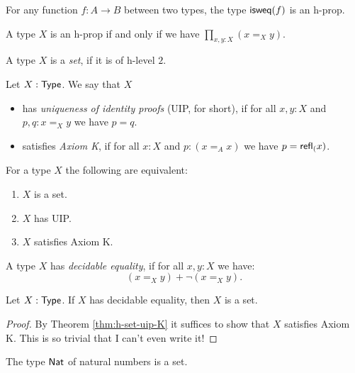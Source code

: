 \begin{cor}
 For any function $f \colon A \to B$ between two types, the type $\mathsf{isweq}(f)$ is an h-prop.
\end{cor}

\begin{thm}
 A type $X$ is an h-prop if and only if we have $\prod\limits_{x, y : X} (x =_X y)$.
\end{thm}

\begin{defn}
 A type $X$ is a {\em set}, if it is of h-level $2$.
\end{defn}

\begin{defn}
 Let $X : \mathsf{Type}$. We say that $X$
 \begin{itemize}
  \item has {\em uniqueness of identity proofs} (UIP, for short), if for all $x, y : X$ and $p, q : x =_X y$ we have $p = q$.
  \item satisfies {\em Axiom K}, if for all $x : X$ and $p : (x =_A x)$ we have $p = \mathsf{refl}_{(} x)$.
 \end{itemize}
\end{defn}

\begin{thm}\label{thm:h-set-uip-K}
 For a type $X$ the following are equivalent:
 \begin{enumerate}
  \item $X$ is a set.
  \item $X$ has UIP.
  \item $X$ satisfies Axiom K.
 \end{enumerate}
\end{thm}

\begin{defn}
 A type $X$ has {\em decidable equality}, if for all $x, y : X$ we have:
 \[(x =_X y) + \neg (x =_X y).\]
\end{defn}

\begin{thm}
 Let $X : \mathsf{Type}$. If $X$ has decidable equality, then $X$ is a set.
\end{thm}

\begin{proof}
 By Theorem \ref{thm:h-set-uip-K} it suffices to show that $X$ satisfies Axiom K. This is so trivial that I can't even write it!
\end{proof}

\begin{thm}\label{prop:nat-is-set}
 The type $\mathsf{Nat}$ of natural numbers is a set.
\end{thm}

